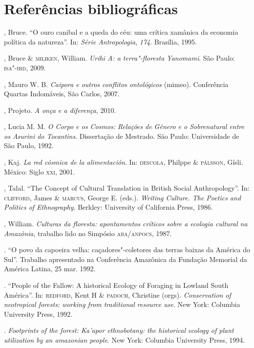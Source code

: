 
\chapter{Referências bibliográficas}

\begin{bibliohedra}
, Bruce. ``O ouro canibal e a queda do céu: uma crítica xamânica da
economia política da natureza''. In: \emph{Série Antropologia},
\emph{174}. Brasília, 1995.

, Bruce \& \textsc{miliken}, William. \emph{Urihi A: a terra"-floresta Yanomami}. São Paulo: \textsc{isa}"-\textsc{ird}, 2009.

, Mauro W. B. \emph{Caipora e outros conflitos ontológicos} (mimeo).
Conferência Quartas Indomáveis, São Carlos, 2007.

, Projeto. \emph{A onça e a diferença}, 2010.

, Lucia M. M. \emph{O Corpo e os Cosmos: Relações de Gênero e o
Sobrenatural entre os Asurini do Tocantins}. Dissertação de Mestrado.
São Paulo: Universidade de São Paulo, 1992.

, Kaj. \emph{La red cósmica de la alimentación}. In: \textsc{descola},
Philppe \& \textsc{pálsson}, Gísli. México: Siglo \textsc{xxi}, 2001.

, Talal. ``The Concept of Cultural Translation in British Social
Anthropology''. In: \textsc{clifford}, James \& \textsc{marcus}, George E. (eds.).
\emph{Writing Culture. The Poetics and Politics of Ethnography}.
Berkley: University of California Press, 1986.

, William. \emph{Culturas da floresta: apontamentos críticos sobre a
ecologia cultural na Amazônia}, trabalho lido no Simpósio \textsc{aba}/\textsc{anpocs}, 1987.

\titidem. ``O povo da capoeira velha: caçadores"-coletores das
terras baixas da América do Sul''. Trabalho apresentado na Conferência
Amazônica da Fundação Memorial da América Latina, 25 mar. 1992. 

\titidem. ``People of the Fallow: A historical Ecology of Foraging
in Lowland South América''. In: \textsc{redford}, Kent H \&  \textsc{padoch}, Christine
(orgs). \emph{Conservation of neotropical forests: working from
traditional resource use}. New York: Columbia University Press, 1992.

\titidem. \emph{Footprints of the forest: Ka'apor ethnobotany:
the historical ecology of plant utilization by an amazonian people}. New
York: Columbia University Press, 1994.


\end{bibliohedra}
